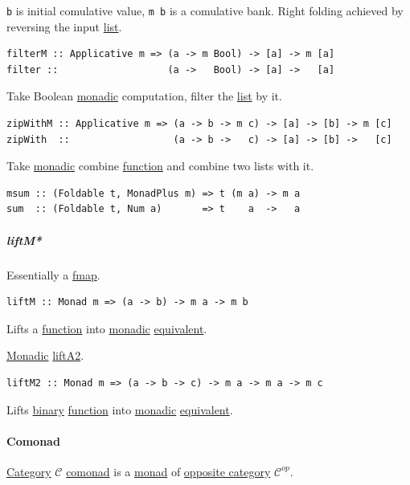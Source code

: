 \documentclass[a4paper,14pt,oneside]{book}
\begin{document}
\texttt{b} is initial comulative value, \texttt{m b} is a comulative bank.
Right folding achieved by reversing the input \hyperref[org2a04873]{list}.

\begin{verbatim}
filterM :: Applicative m => (a -> m Bool) -> [a] -> m [a]
filter ::                   (a ->   Bool) -> [a] ->   [a]
\end{verbatim}

Take Boolean \hyperref[orgc382ab8]{monadic} computation, filter the \hyperref[org2a04873]{list} by it.

\begin{verbatim}
zipWithM :: Applicative m => (a -> b -> m c) -> [a] -> [b] -> m [c]
zipWith  ::                  (a -> b ->   c) -> [a] -> [b] ->   [c]
\end{verbatim}

Take \hyperref[orgc382ab8]{monadic} combine \hyperref[org8ffa6fa]{function} and combine two lists with it.

\begin{verbatim}
msum :: (Foldable t, MonadPlus m) => t (m a) -> m a
sum  :: (Foldable t, Num a)       => t    a  ->   a
\end{verbatim}

\subparagraph{\label{org78792a5}liftM*}
\label{sec:org0248316}
\label{sec:org6a7835b}
Essentially a \hyperref[org05c6550]{fmap}.

\begin{verbatim}
liftM :: Monad m => (a -> b) -> m a -> m b
\end{verbatim}

Lifts a \hyperref[org8ffa6fa]{function} into \hyperref[orgc382ab8]{monadic} \hyperref[org49af476]{equivalent}.

\label{sec:org35dff3b}
\hyperref[orgc382ab8]{Monadic} \hyperref[org0388f10]{liftA2}.
\begin{verbatim}
liftM2 :: Monad m => (a -> b -> c) -> m a -> m a -> m c
\end{verbatim}

Lifts \hyperref[orgd0aab75]{binary} \hyperref[org8ffa6fa]{function} into \hyperref[orgc382ab8]{monadic} \hyperref[org49af476]{equivalent}.

\paragraph{\label{org160c272}Comonad}
\label{sec:org3b99c27}
\hyperref[org62e5296]{Category} \(\mathcal{C}\) \hyperref[org160c272]{comonad} is a \hyperref[org7f47037]{monad} of \hyperref[org6c56c0b]{opposite category} \(\mathcal{C}^{op}\).
\end{document}
